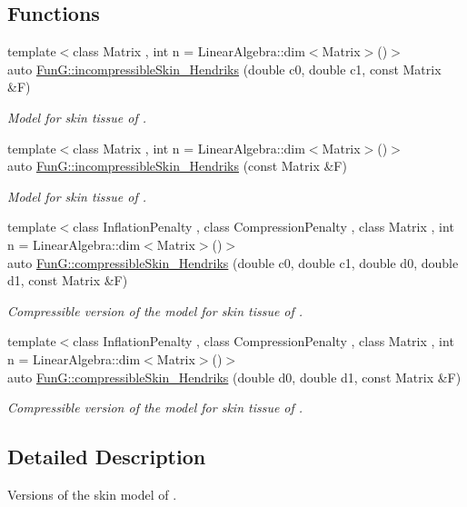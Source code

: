 \subsection*{Functions}
\begin{DoxyCompactItemize}
\item 
{\footnotesize template$<$class Matrix , int n = Linear\-Algebra\-::dim$<$\-Matrix$>$()$>$ }\\auto \hyperlink{group__Biomechanics_gaa20bf15ef6976d64d89490429035b2c4}{Fun\-G\-::incompressible\-Skin\-\_\-\-Hendriks} (double c0, double c1, const Matrix \&F)
\begin{DoxyCompactList}\small\item\em Model for skin tissue of \cite{Hendriks2005}. \end{DoxyCompactList}\item 
{\footnotesize template$<$class Matrix , int n = Linear\-Algebra\-::dim$<$\-Matrix$>$()$>$ }\\auto \hyperlink{group__Biomechanics_gad8653218bd2afb4e3cfd601a5142956c}{Fun\-G\-::incompressible\-Skin\-\_\-\-Hendriks} (const Matrix \&F)
\begin{DoxyCompactList}\small\item\em Model for skin tissue of \cite{Hendriks2005}. \end{DoxyCompactList}\item 
{\footnotesize template$<$class Inflation\-Penalty , class Compression\-Penalty , class Matrix , int n = Linear\-Algebra\-::dim$<$\-Matrix$>$()$>$ }\\auto \hyperlink{group__Biomechanics_ga07b4c52c6ecf7e72f73ab5832fb262cd}{Fun\-G\-::compressible\-Skin\-\_\-\-Hendriks} (double c0, double c1, double d0, double d1, const Matrix \&F)
\begin{DoxyCompactList}\small\item\em Compressible version of the model for skin tissue of \cite{Hendriks2005}. \end{DoxyCompactList}\item 
{\footnotesize template$<$class Inflation\-Penalty , class Compression\-Penalty , class Matrix , int n = Linear\-Algebra\-::dim$<$\-Matrix$>$()$>$ }\\auto \hyperlink{group__Biomechanics_ga42721e772b7eada1b0bca98247ad440f}{Fun\-G\-::compressible\-Skin\-\_\-\-Hendriks} (double d0, double d1, const Matrix \&F)
\begin{DoxyCompactList}\small\item\em Compressible version of the model for skin tissue of \cite{Hendriks2005}. \end{DoxyCompactList}\end{DoxyCompactItemize}


\subsection{Detailed Description}
Versions of the skin model of \cite{Hendriks2005}. 